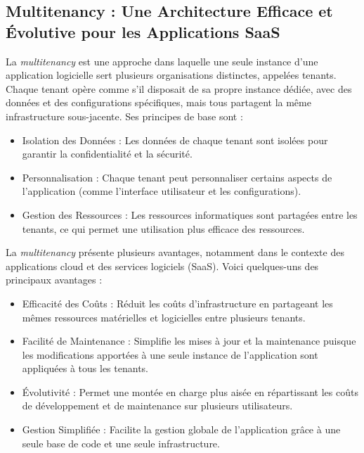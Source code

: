 \subsection{Multitenancy : Une Architecture Efficace et Évolutive pour les Applications SaaS}



\hspace{\parindent}La \textit{multitenancy} est une approche dans laquelle une seule instance d'une application logicielle sert plusieurs organisations distinctes, appelées tenants. Chaque tenant opère comme s'il disposait de sa propre instance dédiée, avec des données et des configurations spécifiques, mais tous partagent la même infrastructure sous-jacente. Ses principes de base sont :

\begin{itemize}
    \item Isolation des Données : Les données de chaque tenant sont isolées pour garantir la confidentialité et la sécurité.

    \item Personnalisation : Chaque tenant peut personnaliser certains aspects de l'application (comme l'interface utilisateur et les configurations).

    \item Gestion des Ressources : Les ressources informatiques sont partagées entre les tenants, ce qui permet une utilisation plus efficace des ressources.

\end{itemize}


La \textit{multitenancy} présente plusieurs avantages, notamment dans le contexte des applications cloud et des services logiciels (SaaS). Voici quelques-uns des principaux avantages :

\begin{itemize}
    \item Efficacité des Coûts : Réduit les coûts d'infrastructure en partageant les mêmes ressources matérielles et logicielles entre plusieurs tenants.

    \item Facilité de Maintenance : Simplifie les mises à jour et la maintenance puisque les modifications apportées à une seule instance de l'application sont appliquées à tous les tenants.

    \item Évolutivité : Permet une montée en charge plus aisée en répartissant les coûts de développement et de maintenance sur plusieurs utilisateurs.

    \item Gestion Simplifiée : Facilite la gestion globale de l'application grâce à une seule base de code et une seule infrastructure.


\end{itemize}


